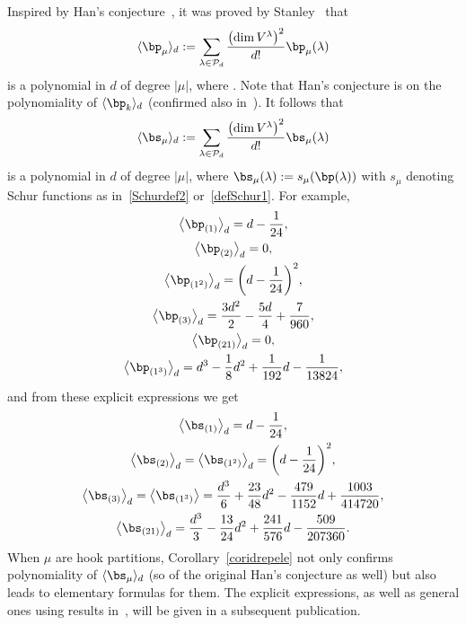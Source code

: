 \documentclass[pdftex]{sigma}
\newcommand{\corr}[1]{\langle {#1} \rangle}
\numberwithin{equation}{section}
\begin{document}
Inspired by Han's conjecture~\cite{Han}, it was proved by Stanley~\cite{S} that
\[
\corr{\bp_\mu}_d:= \sum_{\lambda \in \mathcal{P}_d} \frac{\bigl(\dim V^\lambda\bigr)^2}{d!}
\bp_{\mu}(\lambda)
\]
is a polynomial in $d$ of degree $|\mu|$, where .
Note that Han's conjecture is on the polynomiality of $\corr{\bp_k}_d$ (confirmed also in~\cite{Pan}). It follows that
\[
\corr{\bs_\mu}_d:= \sum_{\lambda \in \mathcal{P}_d} \frac{\bigl(\dim V^\lambda\bigr)^2}{d!}
\bs_{\mu}(\lambda)
\]
is a polynomial in $d$ of degree $|\mu|$, where $\bs_{\mu}(\lambda):=s_\mu (\bp(\lambda))$ with $s_\mu$
denoting Schur functions as in~\eqref{Schurdef2} or~\eqref{defSchur1}.
For example,
\begin{gather*}
\bigl\langle\bp_{(1)}\bigr\rangle_d = d- \frac{1}{24}, \\
\bigl\langle\bp_{(2)}\bigr\rangle_d = 0, \\
\bigl\langle\bp_{(1^2)}\bigr\rangle_d = \biggl(d-\frac{1}{24}\biggr)^2, \\
\bigl\langle\bp_{(3)}\bigr\rangle_d = \frac{3d^2}{2}
- \frac{5d}{4} + \frac{7}{960},\\
\bigl\langle\bp_{(21)}\bigr\rangle_d = 0, \\
\bigl\langle\bp_{(1^3)}\bigr\rangle_d = d^3-\frac{1}{8}d^2
+ \frac{1}{192}d -\frac{1}{13824},
\end{gather*}
and from these explicit expressions we get
\begin{gather*}
\bigl\langle\bs_{(1)}\bigr\rangle_d = d- \frac{1}{24}, \\
\bigl\langle\bs_{(2)}\bigr\rangle_d = \bigl\langle\bs_{(1^2)}\bigr\rangle_d = \biggl(d-\frac{1}{24}\biggr)^2, \\
\bigl\langle\bs_{(3)}\bigr\rangle_d = \bigl\langle\bs_{(1^3)}\bigr\rangle
=\frac{d^3}{6} +\frac{23}{48}d^2-\frac{479}{1152}d
+\frac{1003}{414720}, \\
\bigl\langle\bs_{(21)}\bigr\rangle_d =
\frac{d^3}{3} - \frac{13}{24}d^2
+\frac{241}{576}d
-\frac{509}{207360} .
\end{gather*}
When $\mu$ are hook partitions, Corollary~\ref{coridrepele} not only confirms polynomiality
of $\corr{\bs_\mu}_d$ (so of the original Han's conjecture as well) but also leads to
elementary formulas for them. The explicit expressions, as well as general ones using results in~\cite{DY, DY2, DYZ, Marchal}, will be given
in a subsequent publication.
\end{document}
